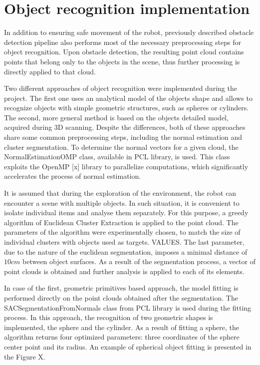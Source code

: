 \section{Object recognition implementation}
\label{sec:detection}

In addition to ensuring safe movement of the robot, previously described obstacle  detection pipeline also performs most of the necessary preprocessing steps for object recognition. Upon obstacle detection, the resulting point cloud contains points that belong only to the objects in the scene, thus further processing is directly applied to that cloud. 

Two different approaches of object recognition were implemented during the project. The first one uses an analytical model of the objects shape and allows to recognize objects with simple geometric structures, such as spheres or cylinders. The second, more general method is based on the objects detailed model, acquired during 3D scanning. Despite the differences, both of these approaches share some common preprocessing steps, including the normal estimation and cluster segmentation. To determine the normal vectors for a given cloud, the NormalEstimationOMP class, available in PCL library, is used. This class exploits the OpenMP [x] library to parallelize computations, which significantly accelerates the process of normal estimation. 

	It is assumed that during the exploration of the environment, the robot can encounter a scene with multiple objects. In such situation, it is convenient to isolate individual items and analyse them separately. For this purpose, a greedy algorithm of Euclidean Cluster Extraction is applied to the point cloud. The parameters of the algorithm were experimentally chosen, to match the size of individual clusters with objects used as targets. VALUES. The last parameter, due to the nature of the euclidean segmentation, imposes a minimal distance of $10cm$ between object surfaces. As a result of the segmentation process, a vector of point clouds is obtained and further analysis is applied to each of its elements.
	
	In case of the first, geometric primitives based approach, the model fitting is performed directly on the point clouds obtained after the segmentation. The SACSegmentationFromNormals class from PCL library is used during the fitting process. In this approach, the recognition of two geometric shapes is implemented, the sphere and the cylinder. As a result of fitting a sphere, the algorithm returns four optimized parameters: three coordinates of the sphere center point and its radius. An example of spherical object fitting is presented in the Figure X.
	
